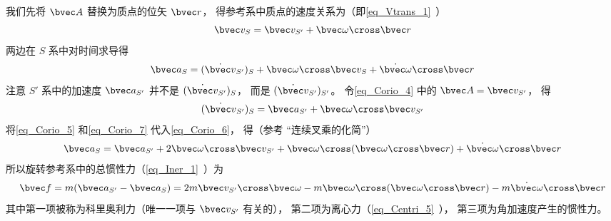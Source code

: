 我们先将 $\bvec A$ 替换为质点的位矢 $\bvec r$， 得参考系中质点的速度关系为（即\autoref{eq_Vtrans_1}~）
\begin{equation}\label{eq_Corio_5}
\bvec v_{S} = \bvec v_{S'} + \bvec\omega\cross\bvec r
\end{equation}
两边在 $S$ 系中对时间求导得
\begin{equation}\label{eq_Corio_6}
\bvec a_{S} = (\dot{\bvec v}_{S'})_{S} + \bvec\omega\cross\bvec v_{S} + \dot{\bvec\omega} \cross\bvec r
\end{equation}
注意 $S'$ 系中的加速度 $\bvec a_{S'}$ 并不是 $(\dot{\bvec v}_{S'})_{S}$， 而是 $(\dot{\bvec v}_{S'})_{S'}$。 令\autoref{eq_Corio_4} 中的 $\bvec A = \bvec v_{S'}$， 得
\begin{equation}\label{eq_Corio_7}
(\dot{\bvec v}_{S'})_{S} = \bvec a_{S'} + \bvec\omega\cross\bvec v_{S'}
\end{equation}
将\autoref{eq_Corio_5} 和\autoref{eq_Corio_7} 代入\autoref{eq_Corio_6}， 得（参考 “连续叉乘的化简”）
\begin{equation}
\bvec a_{S} = \bvec a_{S'} + 2\bvec\omega\cross\bvec v_{S'} + \bvec\omega\cross(\bvec\omega\cross\bvec r) + \dot{\bvec\omega} \cross\bvec r
\end{equation}
所以旋转参考系中的总惯性力（\autoref{eq_Iner_1}~）为
\begin{equation}\label{eq_Corio_1}
\bvec f = m(\bvec a_{S'} - \bvec a_{S}) = 2m\bvec v_{S'}\cross \bvec\omega  -m\bvec\omega\cross(\bvec\omega\cross\bvec r) - m \dot{\bvec\omega} \cross\bvec r
\end{equation}
其中第一项被称为科里奥利力（唯一一项与 $\bvec v_{S'}$ 有关的）， 第二项为离心力（\autoref{eq_Centri_5}~）， 第三项为角加速度产生的惯性力。
